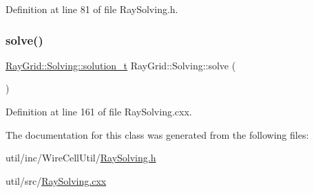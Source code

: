 Definition at line 81 of file Ray\+Solving.\+h.

\mbox{\label{class_wire_cell_1_1_ray_grid_1_1_solving_afbccf47ec02f686eb9e5ebec398ee467}} 
\subsubsection{\texorpdfstring{solve()}{solve()}}
{\footnotesize\ttfamily \hyperlink{class_wire_cell_1_1_ray_grid_1_1_solving_a51d0173e0e992f53ab92b27f72d65629}{Ray\+Grid\+::\+Solving\+::solution\+\_\+t} Ray\+Grid\+::\+Solving\+::solve (\begin{DoxyParamCaption}{ }\end{DoxyParamCaption})}



Definition at line 161 of file Ray\+Solving.\+cxx.



The documentation for this class was generated from the following files\+:\begin{DoxyCompactItemize}
\item 
util/inc/\+Wire\+Cell\+Util/\hyperlink{_ray_solving_8h}{Ray\+Solving.\+h}\item 
util/src/\hyperlink{_ray_solving_8cxx}{Ray\+Solving.\+cxx}\end{DoxyCompactItemize}
